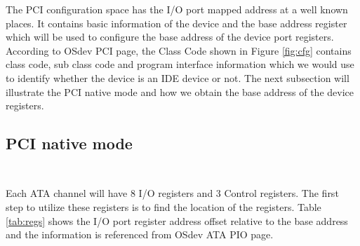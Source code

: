 \documentclass[11pt]{article}
\begin{document}
The PCI configuration space has the I/O port mapped address at a well known places. It contains basic information of the device and the base address register which will be used to configure the base address of the device port registers.\\

According to OSdev PCI page\cite{OSDev_PCI}, the Class Code shown in Figure \ref{fig:cfg} contains class code, sub class code and program interface information which we would use to identify whether the device is an IDE device or not. The next subsection will illustrate the PCI native mode and how we obtain the base address of the device registers.


\subsection{PCI native mode\\\\}

Each ATA channel will have 8 I/O registers and 3 Control registers. The first step to utilize these registers is to find the location of the registers. Table \ref{tab:regs} shows the I/O port register address offset relative to the base address and the information is referenced from OSdev ATA PIO page\cite{OSDev_PIO}.\\

 \begin{table}[h!]
 \center
 \caption{ATA I/O registers}
 \label{tab:regs}
   
 \end{table}
\end{document}
